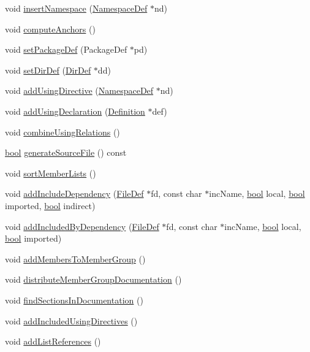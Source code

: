 \begin{DoxyCompactItemize}
\item 
void \hyperlink{class_file_def_a579c95408a34b048fc3cd288bfa8893c}{insert\+Namespace} (\hyperlink{class_namespace_def}{Namespace\+Def} $\ast$nd)
\item 
void \hyperlink{class_file_def_a8ab814579e542ea5325a6d5d386c56a2}{compute\+Anchors} ()
\item 
void \hyperlink{class_file_def_a45289f4084172bcc378d6cce05f69fb3}{set\+Package\+Def} (Package\+Def $\ast$pd)
\item 
void \hyperlink{class_file_def_af52c3153426bb05231bc7df5e4b5e498}{set\+Dir\+Def} (\hyperlink{class_dir_def}{Dir\+Def} $\ast$dd)
\item 
void \hyperlink{class_file_def_af23fb1fdd4ed42a2ea4334dea83307d2}{add\+Using\+Directive} (\hyperlink{class_namespace_def}{Namespace\+Def} $\ast$nd)
\item 
void \hyperlink{class_file_def_afcb259a4f68f6840806d8b7e5176f593}{add\+Using\+Declaration} (\hyperlink{class_definition}{Definition} $\ast$def)
\item 
void \hyperlink{class_file_def_ac57b260b28e22bdf186dc3e57f121891}{combine\+Using\+Relations} ()
\item 
\hyperlink{qglobal_8h_a1062901a7428fdd9c7f180f5e01ea056}{bool} \hyperlink{class_file_def_a95b32ac6e7685c2461046c98e9f3af90}{generate\+Source\+File} () const 
\item 
void \hyperlink{class_file_def_a31bdeeeb4ffdaeac2636c7c5027a8d6b}{sort\+Member\+Lists} ()
\item 
void \hyperlink{class_file_def_a409353a6de84bb6fccfefb9897b6f746}{add\+Include\+Dependency} (\hyperlink{class_file_def}{File\+Def} $\ast$fd, const char $\ast$inc\+Name, \hyperlink{qglobal_8h_a1062901a7428fdd9c7f180f5e01ea056}{bool} local, \hyperlink{qglobal_8h_a1062901a7428fdd9c7f180f5e01ea056}{bool} imported, \hyperlink{qglobal_8h_a1062901a7428fdd9c7f180f5e01ea056}{bool} indirect)
\item 
void \hyperlink{class_file_def_af844c9c34c6f823c3ef1a63896eca26b}{add\+Included\+By\+Dependency} (\hyperlink{class_file_def}{File\+Def} $\ast$fd, const char $\ast$inc\+Name, \hyperlink{qglobal_8h_a1062901a7428fdd9c7f180f5e01ea056}{bool} local, \hyperlink{qglobal_8h_a1062901a7428fdd9c7f180f5e01ea056}{bool} imported)
\item 
void \hyperlink{class_file_def_a2b9aea5dff41f072486193527fd1a500}{add\+Members\+To\+Member\+Group} ()
\item 
void \hyperlink{class_file_def_a7974ff660e62bc06738fa3098ffac1e8}{distribute\+Member\+Group\+Documentation} ()
\item 
void \hyperlink{class_file_def_a853d5e3b1c9ce164cfd2c5c5b5bff042}{find\+Sections\+In\+Documentation} ()
\item 
void \hyperlink{class_file_def_a364521fb6ffb159910421580992445ba}{add\+Included\+Using\+Directives} ()
\item 
void \hyperlink{class_file_def_a00c1d42689c72a489df756202e6086a7}{add\+List\+References} ()
\end{DoxyCompactItemize}
